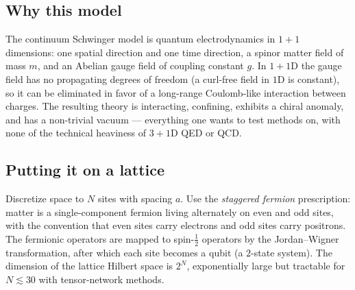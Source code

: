 \documentclass[11pt,a4paper]{article}
\theoremstyle{definition}
\theoremstyle{plain}
\theoremstyle{remark}
\begin{document}
\subsection{Why this model}

The continuum Schwinger model is quantum electrodynamics in $1{+}1$
dimensions: one spatial direction and one time direction, a spinor
matter field of mass $m$, and an Abelian gauge field of coupling
constant $g$.  In $1{+}1$D the gauge field has no propagating
degrees of freedom (a curl-free field in $1$D is constant), so it
can be eliminated in favor of a long-range Coulomb-like interaction
between charges.  The resulting theory is interacting, confining,
exhibits a chiral anomaly, and has a non-trivial vacuum --- everything
one wants to test methods on, with none of the technical heaviness of
$3{+}1$D QED or QCD.

\subsection{Putting it on a lattice}

Discretize space to $N$ sites with spacing $a$.  Use the
\emph{staggered fermion} prescription: matter is a single-component
fermion living alternately on even and odd sites, with the convention
that even sites carry electrons and odd sites carry positrons.  The
fermionic operators are mapped to spin-$\tfrac12$ operators by the
Jordan--Wigner transformation, after which each site becomes a qubit
(a $2$-state system).  The dimension of the lattice Hilbert space is
$2^N$, exponentially large but tractable for $N \lesssim 30$ with
tensor-network methods.
\end{document}
